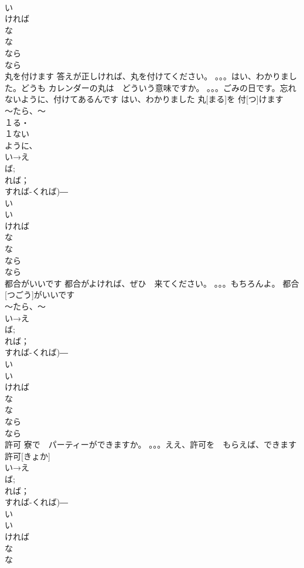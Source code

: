 \documentclass[8pt]{extreport}
\begin{document}
\begin{CJK}{UTF8}{min}
\\	い　
\\	ければ　
\\	な 
\\	な
\\	なら　
\\	なら
\\	丸を付けます	答えが正しければ、丸を付けてください。 。。。はい、わかりました。どうも カレンダーの丸は　どういう意味ですか。 。。。ごみの日です。忘れないように、付けてあるんです はい、わかりました	丸[まる]を 付[つ]けます			
\\	～たら、～
\\	１る・
\\	１ない
\\	ように、
\\	い→え
\\	ば;
\\	れば；
\\	すれば-くれば)―　
\\	い
\\	い　
\\	ければ　
\\	な 
\\	な
\\	なら　
\\	なら
\\	都合がいいです	都合がよければ、ぜひ　来てください。 。。。もちろんよ。	都合[つごう]がいいです			
\\	～たら、～
\\	い→え
\\	ば;
\\	れば；
\\	すれば-くれば)―　
\\	い
\\	い　
\\	ければ　
\\	な 
\\	な
\\	なら　
\\	なら
\\	許可	寮で　パーティーができますか。 。。。ええ、許可を　もらえば、できます	許可[きょか]			
\\	い→え
\\	ば;
\\	れば；
\\	すれば-くれば)―　
\\	い
\\	い　
\\	ければ　
\\	な 
\\	な

\end{CJK}
\end{document}
